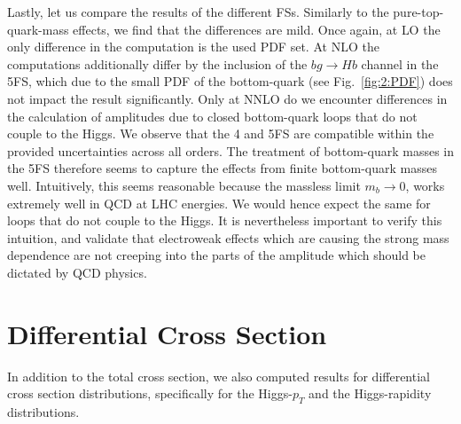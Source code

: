 Lastly, let us compare the results of the different \acs{FS}s. Similarly to the pure-top-quark-mass effects, we find that the differences are mild. Once again, at \acs{LO} the only difference in the computation is the used \acs{PDF} set. At \acs{NLO} the computations additionally differ by the inclusion of the $b g \longrightarrow Hb$ channel in the 5\acs{FS}, which due to the small \acs{PDF} of the bottom-quark (see Fig.~\ref{fig:2:PDF}) does not impact the result significantly. Only at \acs{NNLO} do we encounter differences in the calculation of amplitudes due to closed bottom-quark loops that do not couple to the Higgs. We observe that the 4 and 5\acs{FS} are compatible within the provided uncertainties across all orders. The treatment of bottom-quark masses in the 5\acs{FS} therefore seems to capture the effects from finite bottom-quark masses well. Intuitively, this seems reasonable because the massless limit $m_b \rightarrow 0$, works extremely well in \acs{QCD} at \acs{LHC} energies. We would hence expect the same for loops that do not couple to the Higgs. It is nevertheless important to verify this intuition, and validate that electroweak effects which are causing the strong mass dependence are not creeping into the parts of the amplitude which should be dictated by \acs{QCD} physics.

\section{Differential Cross Section}
In addition to the total cross section, we also computed results for differential cross section distributions, specifically for the Higgs-$p_T$ and the Higgs-rapidity distributions.

